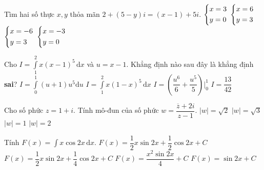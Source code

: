 \begin{ex}%
	Tìm hai số thực $x, y$ thỏa mãn $2+(5-y)i=(x-1)+5i$.
	\choice%
	{\True $\left\{\begin{aligned}&x=3\\&y=0\end{aligned}\right.$}
	{$\left\{\begin{aligned}&x=6\\&y=3\end{aligned}\right.$}
	{$\left\{\begin{aligned}&x=-6\\&y=3\end{aligned}\right.$}
	{$\left\{\begin{aligned}&x=-3\\&y=0\end{aligned}\right.$}
\end{ex}

\begin{ex}%
	Cho $I=\displaystyle \int\limits_{1}^{2} x(x-1)^5 \mathrm{\,d}x$ và $u=x-1$. Khẳng định nào sau đây là khẳng định {\bf sai}?
	\choice%
	{$I=\displaystyle \int\limits_{0}^{1} (u+1)u^5 \mathrm{d}u$}
	{$I=\displaystyle \int\limits_{1}^{2} x(1-x)^5 \mathrm{\,d}x$}
	{\True $I=\left(\dfrac{u^6}{6}+\dfrac{u^5}{5}\right) \biggr|_0^1$}
	{$I=\dfrac{13}{42}$}
\end{ex}

\begin{ex}%
	Cho số phức $z=1+i$. Tính mô-đun của số phức $w=\dfrac{\overline{z}+2i}{z-1}$.
	\choice%
	{\True $|w|=\sqrt{2}$}
	{$|w|=\sqrt{3}$}
	{$|w|=1$}
	{$|w|=2$}
\end{ex}

\begin{ex}%
	Tính $F(x)=\displaystyle \int x\cos2x \mathrm{\,d}x.$
	\choice%
	{$F(x)=\dfrac{1}{2}x\sin2x+\dfrac{1}{2}\cos2x +C$}
	{\True $F(x)=\dfrac{1}{2}x\sin2x+\dfrac{1}{4}\cos2x +C$}
	{$F(x)=\dfrac{x^2\sin2x}{4}+C$}
	{$F(x)=\sin2x+C$}
\end{ex}

